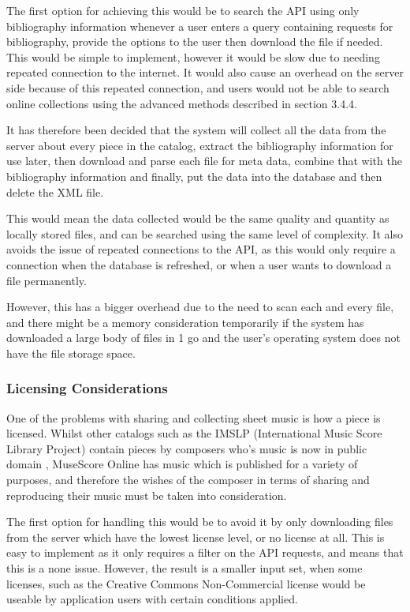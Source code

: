 The first option for achieving this would be to search the API using only bibliography information whenever a user enters a query containing requests for bibliography, provide the options to the user then download the file if needed. This would be simple to implement, however it would be slow due to needing repeated connection to the internet. It would also cause an overhead on the server side because of this repeated connection, and users would not be able to search online collections using the advanced methods described in section 3.4.4. 

It has therefore been decided that the system will collect all the data from the server about every piece in the catalog, extract the bibliography information for use later, then download and parse each file for meta data, combine that with the bibliography information and finally, put the data into the database and then delete the XML file. 

This would mean the data collected would be the same quality and quantity as locally stored files, and can be searched using the same level of complexity. It also avoids the issue of repeated connections to the API, as this would only require a connection when the database is refreshed, or when a user wants to download a file permanently.

However, this has a bigger overhead due to the need to scan each and every file, and there might be a memory consideration temporarily if the system has downloaded a large body of files in 1 go and the user's operating system does not have the file storage space.

\subsubsection{Licensing Considerations}
One of the problems with sharing and collecting sheet music is how a piece is licensed. Whilst other catalogs such as the IMSLP (International Music Score Library Project) contain pieces by composers who's music is now in public domain \parencite{imslp}, MuseScore Online has music which is published for a variety of purposes, and therefore the wishes of the composer in terms of sharing and reproducing their music must be taken into consideration.

The first option for handling this would be to avoid it by only downloading files from the server which have the lowest license level, or no license at all. This is easy to implement as it only requires a filter on the API requests, and means that this is a none issue. However, the result is a smaller input set, when some licenses, such as the Creative Commons Non-Commercial license \parencite{cc-nc} would be useable by application users with certain conditions applied.

